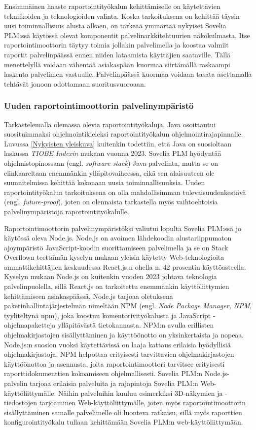 Ensimmäinen haaste raportointityökalun kehittämiselle on käytettävien tekniikoiden ja teknologioiden valinta. Koska tarkoituksena on kehittää täysin uusi toiminnallisuus alusta alkaen, on tärkeää ymmärtää nykyiset Sovelia PLM:ssä käytössä olevat komponentit palvelinarkkitehtuurien näkökulmasta. Itse raportointimoottorin täytyy toimia jollakin palvelimella ja koostaa valmiit raportit palvelinpäässä ennen niiden lataamista käyttäjien saataville. Tällä menettelyllä voidaan vähentää asiakaspään kuormaa siirtämällä raskaampi laskenta palvelimen vastuulle. Palvelinpäässä kuormaa voidaan tasata asettamalla tehtävät jonoon odottamaan suoritusvuoroaan.

\subsubsection{Uuden raportointimoottorin palvelinympäristö}

Tarkastelemalla olemassa olevia raportointityökaluja, Java osoittautui suosituimmaksi ohjelmointikieleksi raportointityökalun ohjelmointirajapinnalle. Luvussa \ref{Nykyisten yleiskuva} kuitenkin todettiin, että Java on suosioltaan laskussa \textit{TIOBE Indexin} mukaan vuonna 2023. Sovelia PLM hyödyntää ohjelmistopinossaan (engl. \textit{software stack}) Java-palvelinta, mutta se on elinkaareltaan enemmänkin ylläpitovaiheessa, eikä sen alaisuuteen ole suunnitelmissa kehittää kokonaan uusia toiminnallisuuksia. Uuden raportointityökalun tarkoituksena on olla mahdollisimman tulevaisuudenkestävä (engl. \textit{future-proof}), joten on olennaista tarkastella myös vaihtoehtoisia palvelinympäristöjä raportointityökalulle.

Raportointimoottorin palvelinympäristöksi valiutui lopulta Sovelia PLM:ssä jo käytössä oleva Node.js. Node.js on avoimen lähdekoodin alustariippumaton ajoympäristö JavaScript-koodin suorittamiseen palvelimella ja se on Stack Overflown teettämän kyselyn mukaan yleisin käytetty Web-teknologioita ammattikehittäjien keskuudessa React.js:n ohella n. 42 prosentin käyttöasteella. \cite{stackoverflowStackOverflow} Kyselyn mukaan Node.js on kuitenkin vuoden 2023 johtava teknologia palvelinpuolella, sillä React.js on tarkoitettu enemmänkin käyttöliittymien kehittämiseen asiakaspäässä. Node.js tarjoaa oletuksena paketinhallintajärjestelmän nimeltään NPM (engl. \textit{Node Package Manager, NPM}, tyyliteltynä npm), joka koostuu komentorivityökalusta ja JavaScript -ohjelmapaketteja ylläpitävästä tietokannasta. NPM:n avulla erillisten ohjelmakirjastojen sisällyttäminen ja käyttöönotto on yksinkertaista ja nopeaa.\cite{npmjsAbout} Node.js:n suosion vuoksi käytettävissä on laaja kattaus erilaisia hyödyllisiä ohjelmakirjastoja. NPM helpottaa erityisesti tarvittavien ohjelmakirjastojen käyttöönottoa ja asennusta, joita raportointimoottori tarvitsee erityisesti raporttidokumenttien kokoamiseen ohjelmallisesti. Sovelia PLM:n Node.js-palvelin tarjoaa erilaisia palveluita ja rajapintoja Sovelia PLM:n Web-käyttöliittymälle. Näihin palveluihin kuuluu esimerkiksi 3D-näkymien ja -tiedostojen tarjoaminen Web-käyttöliittymälle, joten myös raportointimoottorin sisällyttäminen samalle palvelimelle oli luonteva ratkaisu, sillä myös raporttien konfigurointityökalu tullaan kehittämään Sovelia PLM:n web-käyttöliittymään.

